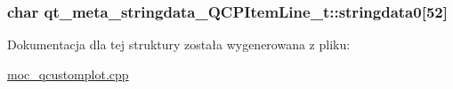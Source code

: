 \subsubsection[{\texorpdfstring{stringdata0}{stringdata0}}]{\setlength{\rightskip}{0pt plus 5cm}char qt\+\_\+meta\+\_\+stringdata\+\_\+\+Q\+C\+P\+Item\+Line\+\_\+t\+::stringdata0\mbox{[}52\mbox{]}}\hypertarget{structqt__meta__stringdata___q_c_p_item_line__t_a35c5e2ac8b06d8035260983dc8b9dafa}{}\label{structqt__meta__stringdata___q_c_p_item_line__t_a35c5e2ac8b06d8035260983dc8b9dafa}


Dokumentacja dla tej struktury została wygenerowana z pliku\+:\begin{DoxyCompactItemize}
\item 
\hyperlink{moc__qcustomplot_8cpp}{moc\+\_\+qcustomplot.\+cpp}\end{DoxyCompactItemize}
